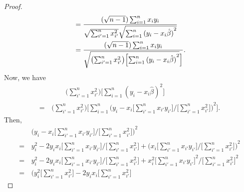 \begin{itemize}
\begin{proof}
\begin{equation*}
\begin{split}
                    &= \frac{(\sqrt{n - 1})\sum_{i=1}^n x_i y_i}
                    {
                        \sqrt{\sum_{i'=1}^n x_{i'}^2}
                        \sqrt{\sum_{i=1}^n {(y_i - x_i\hat{\beta})}^2}
                    } \\
                    &= \frac{(\sqrt{n - 1})\sum_{i=1}^n x_i y_i}
                    {
                        \sqrt{\bigl(\sum_{i'=1}^n x_{i'}^2\bigr)
                        \Bigl[\sum_{i=1}^n {(y_i - x_i\hat{\beta})}^2}\Bigr]
                    }.
                \end{split}
            \end{equation*}
            Now, we have
            \begin{equation*}
                \begin{split}
                    &\qquad \Biggl(\sum_{i'=1}^n x_{i'}^2\Biggr)
                    \Biggl[\sum_{i=1}^n {(y_i - x_i\hat{\beta})}^2\Biggr] \\
                    = \, &\Biggl(\sum_{i'=1}^n x_{i'}^2\Biggr)
                    \Biggl[\sum_{i=1}^n {\Biggl(y_i - x_i
                                \Biggl[\sum_{i'=1}^n x_{i'}y_{i'}\Biggr] /
                        \Biggl[\sum_{i'=1}^n x_{i'}^2\Biggr]\Biggr)}^2
                    \Biggr].
                \end{split}
            \end{equation*}
            Then,
            \begin{equation*}
                \begin{split}
                    &{\Biggl(y_i - x_i
                            \Biggl[\sum_{i'=1}^n x_{i'}y_{i'}\Biggr] /
                    \Biggl[\sum_{i'=1}^n x_{i'}^2\Biggr]\Biggr)}^2 \\
                    = \, &y_i^2 - 2y_ix_i \Biggl[\sum_{i'=1}^n x_{i'}y_{i'}\Biggr] /
                    \Biggl[\sum_{i'=1}^n x_{i'}^2\Biggr]
                    + {\Biggl(x_i \Biggl[\sum_{i'=1}^n x_{i'}y_{i'}\Biggr] /
                    \Biggl[\sum_{i'=1}^n x_{i'}^2\Biggr]\Biggr)}^2 \\
                    = \, &y_i^2 - 2y_ix_i \Biggl[\sum_{i'=1}^n x_{i'}y_{i'}\Biggr] /
                    \Biggl[\sum_{i'=1}^n x_{i'}^2\Biggr]
                    + x_i^2 {\Biggl[\sum_{i'=1}^n x_{i'}y_{i'}\Biggr]}^2 /
                    {\Biggl[\sum_{i'=1}^n x_{i'}^2\Biggr]}^2 \\
                    = \, &\Biggl(y_i^2\Biggl[\sum_{i'=1}^n x_{i'}^2\Biggr]
                        - 2y_ix_i \Biggl[\sum_{i'=1}^n x_{i'}^2\Biggr]

\end{split}
\end{equation*}
\end{proof}
\end{itemize}
